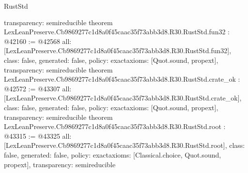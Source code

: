 \begin{lexlean}{RustStd}
\begin{coremodule}
{  transparency: semireducible
}
theorem LexLeanPreserve.Cb9869277c1d8a0f45caac35f73abb3d8.R30.RustStd.fun32 : @42160 := @42568 {
  all: [LexLeanPreserve.Cb9869277c1d8a0f45caac35f73abb3d8.R30.RustStd.fun32],
  class: false,
  generated: false,
  policy: exact{axioms: [Quot.sound, propext]},
  transparency: semireducible
}
theorem LexLeanPreserve.Cb9869277c1d8a0f45caac35f73abb3d8.R30.RustStd.crate_ok : @42572 := @43307 {
  all: [LexLeanPreserve.Cb9869277c1d8a0f45caac35f73abb3d8.R30.RustStd.crate_ok],
  class: false,
  generated: false,
  policy: exact{axioms: [Quot.sound, propext]},
  transparency: semireducible
}
theorem LexLeanPreserve.Cb9869277c1d8a0f45caac35f73abb3d8.R30.RustStd.root : @43315 := @43325 {
  all: [LexLeanPreserve.Cb9869277c1d8a0f45caac35f73abb3d8.R30.RustStd.root],
  class: false,
  generated: false,
  policy: exact{axioms: [Classical.choice, Quot.sound, propext]},
  transparency: semireducible
}


\end{coremodule}
\end{lexlean}

